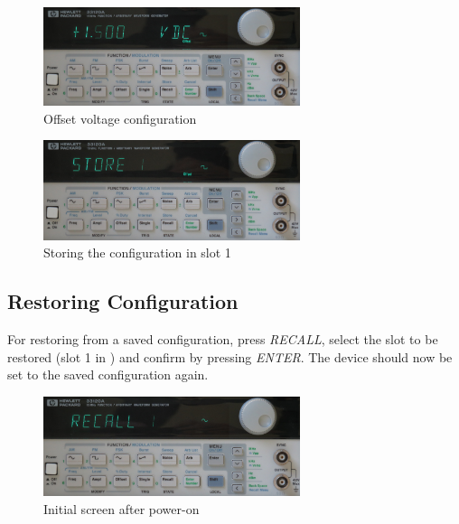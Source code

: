 \begin{figure}
    \centering
    \includegraphics[width=0.67\textwidth]{images/funcGen/funcGen-08.jpg}
    \caption{Offset voltage configuration}
    \label{fig:HPwave:offset}
\end{figure}

\begin{figure}
    \centering
    \includegraphics[width=0.67\textwidth]{images/funcGen/funcGen-09.jpg}
    \caption{Storing the configuration in slot 1}
    \label{fig:HPwave:store}
\end{figure}


\clearpage
\subsection{Restoring Configuration}
\label{subsec:HPwave:restoringConfig}

For restoring from a saved configuration, press \emph{RECALL}, select the slot
to be  restored (slot 1  in ) and confirm  by pressing
\emph{ENTER}.  The device should now be set to the saved configuration again.


\begin{figure}
    \centering
    \includegraphics[width=0.67\textwidth]{images/funcGen/funcGen-11.jpg}
    \caption{Initial screen after power-on}
    \label{fig:HPwave:recall}
\end{figure}

    \centering
